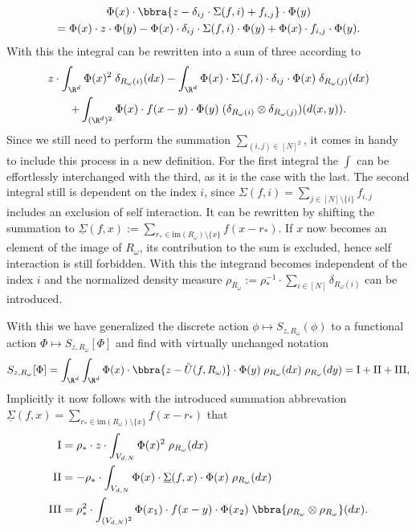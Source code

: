 \begin{multline*}
    \Phi(x)\cdot\bbra{
        z - \delta_{ij}\cdot\Sigma(f,i) + f_{i,j}
    }\cdot\Phi(y) \\
    = \Phi(x)\cdot z\cdot \Phi(y) - \Phi(x)\cdot\delta_{ij}\cdot\Sigma(f,i)\cdot\Phi(y) + \Phi(x)\cdot f_{i,j}\cdot\Phi(y).
\end{multline*}
With this the integral can be rewritten into a sum of three according to
\begin{multline*}
    z\cdot\int_{\R^d}\Phi(x)^2\;\delta_{R_\omega(i)}(dx) - \int_{\R^d}\Phi(x)\cdot\Sigma(f,i)\cdot\delta_{ij}\cdot\Phi(x)\;\delta_{R_\omega(j)}(dx) \\
    + \int_{(\R^d)^2}\Phi(x)\cdot f(x-y)\cdot\Phi(y)\;(\delta_{R_\omega(i)}\otimes\delta_{R_\omega(j)})(d(x,y)). 
\end{multline*}
Since we still need to perform the summation $\sum_{(i,j)\in[N]^2}$, it comes in handy to include this process in a new definition. For the first integral the $\int$ can be effortlessly interchanged with the third, as it is the case with the last. The second integral still is dependent on the index $i$, since $\Sigma(f,i) = \sum_{j\in[N]\setminus\{i\}}f_{i,j}$ includes an exclusion of self interaction. It can be rewritten by shifting the summation to $\underline\Sigma(f,x):=\sum_{r_*\in\text{im}(R_\omega)\setminus\{x\}}f(x - r_*)$. If $x$ now becomes an element of the image of $R_\omega$, its contribution to the sum is excluded, hence self interaction is still forbidden. With this the integrand becomes independent of the index $i$ and the normalized density measure $\rho_{R_\omega}:= \rho_*^{-1}\cdot\sum_{i\in[N]}\delta_{R_\omega(i)}$ can be introduced. 

With this we have generalized the discrete action $\phi\mapsto S_{z,R_\omega}(\phi)$ to a functional action $\Phi\mapsto S_{z,R_\omega}[\Phi]$ and find with virtually unchanged notation
\[
    S_{z,R_{\omega}}[\Phi] = \int_{\R^d}\int_{\R^d}\Phi(x)\cdot\bbra{z - \tilde U(f,R_\omega)}\cdot\Phi(y)\;\rho_{R_\omega}(dx)\;\rho_{R_\omega}(dy) = \text{I} + \text{II} + \text{III},
\]
Implicitly it now follows with the introduced summation abbrevation $\underline\Sigma(f,x) = \sum_{r_*\in\text{im}(R_\omega)\setminus\{x\}}f(x - r_*)$ that
\begin{align}
    \text{I} &= \rho_*\cdot z\cdot\int_{V_{d,N}}\Phi(x)^2\;\rho_{R_\omega}(dx) \\
    \text{II} &= -\rho_*\cdot\int_{V_{d,N}}\Phi(x)\cdot\underline\Sigma(f,x)\cdot\Phi(x)\;\rho_{R_\omega}(dx) \\
    \text{III} &= \rho_*^2\cdot\int_{(V_{d,N})^2}\Phi(x_1)\cdot f(x-y)\cdot\Phi(x_2)\;\bbra{
        \rho_{R_\omega}\otimes\rho_{R_\omega}
    }(dx).
\end{align}
